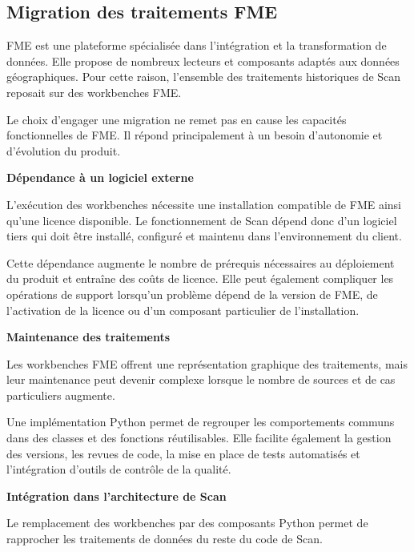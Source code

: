 \subsection{Migration des traitements FME}
\label{subsec:problematique_fme}

FME est une plateforme spécialisée dans l'intégration et la transformation de
données. Elle propose de nombreux lecteurs et composants adaptés aux données
géographiques. Pour cette raison, l'ensemble des traitements historiques de
Scan reposait sur des workbenches FME.

Le choix d'engager une migration ne remet pas en cause les capacités
fonctionnelles de FME. Il répond principalement à un besoin d'autonomie et
d'évolution du produit.

\medskip

\noindent
\textbf{Dépendance à un logiciel externe}

\medskip

L'exécution des workbenches nécessite une installation compatible de FME ainsi
qu'une licence disponible. Le fonctionnement de Scan dépend donc d'un logiciel
tiers qui doit être installé, configuré et maintenu dans l'environnement du
client.

Cette dépendance augmente le nombre de prérequis nécessaires au déploiement du
produit et entraîne des coûts de licence. Elle peut également compliquer les
opérations de support lorsqu'un problème dépend de la version de FME, de
l'activation de la licence ou d'un composant particulier de l'installation.

\medskip

\noindent
\textbf{Maintenance des traitements}

\medskip

Les workbenches FME offrent une représentation graphique des traitements, mais
leur maintenance peut devenir complexe lorsque le nombre de sources et de cas
particuliers augmente.

Une implémentation Python permet de regrouper les comportements communs dans
des classes et des fonctions réutilisables. Elle facilite également la gestion
des versions, les revues de code, la mise en place de tests automatisés et
l'intégration d'outils de contrôle de la qualité.

\medskip

\noindent
\textbf{Intégration dans l'architecture de Scan}

\medskip

Le remplacement des workbenches par des composants Python permet de rapprocher
les traitements de données du reste du code de Scan.

